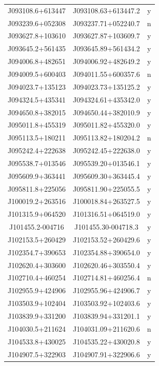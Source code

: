 \begin{table}
\begin{tabular}{ccc}
        J093108.6+613447 & J093108.63+613447.2 & y\\
        J093239.6+052308 & J093237.71+052240.7 & n\\
        J093627.8+103610 & J093627.87+103609.7 & y\\
        J093645.2+561435 & J093645.89+561434.2 & y\\
        J094006.8+482651 & J094006.92+482649.2 & y\\
        J094009.5+600403 & J094011.55+600357.6 & n\\
        J094023.7+135123 & J094023.73+135125.2 & y\\
        J094324.5+435341 & J094324.61+435342.0 & y\\
        J094650.8+382015 & J094650.44+382010.9 & y\\
        J095011.8+455319 & J095011.82+455320.0 & y\\
        J095113.5+180211 & J095113.82+180204.2 & n\\
        J095242.4+222638 & J095242.45+222638.0 & y\\
        J095538.7+013546 & J095539.20+013546.1 & y\\
        J095609.9+363441 & J095609.30+363445.4 & y\\
        J095811.8+225056 & J095811.90+225055.5 & y\\
        J100019.2+263516 & J100018.84+263527.5 & y\\
        J101315.9+064520 & J101316.51+064519.0 & y\\
        J101455.2-004716 & J101455.30-004718.3 & y\\
        J102153.5+260429 & J102153.52+260429.6 & y\\
        J102354.7+390653 & J102354.88+390654.0 & y\\
        J102620.4+303600 & J102620.46+303550.4 & y\\
        J102710.4+460254 & J102714.81+460256.4 & n\\
        J102955.9+424906 & J102955.96+424906.7 & y\\
        J103503.9+102404 & J103503.92+102403.6 & y\\
        J103839.9+331200 & J103839.94+331201.1 & y\\
        J104030.5+211624 & J104031.09+211620.6 & n\\
        J104533.8+430025 & J104535.22+430020.8 & y\\
        J104907.5+322903 & J104907.91+322906.6 & y\\

\end{tabular}
\end{table}
